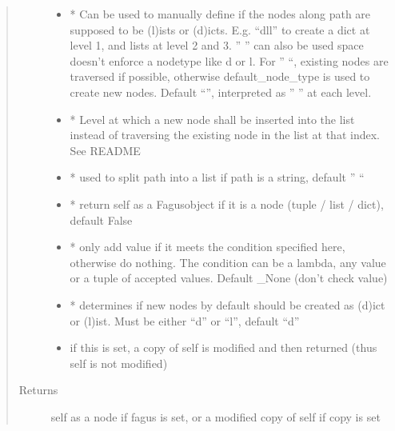 \documentclass[a4paper,10pt,english]{sphinxmanual}
\begin{document}
\begin{fulllineitems}
\begin{fulllineitems}
\begin{quote}
\begin{description}
\begin{itemize}
\item {}
\sphinxAtStartPar
{} \textendash{} * Can be used to manually define if the nodes along path are supposed to be (l)ists or
(d)icts. E.g. “dll” to create a dict at level 1, and lists at level 2 and 3. ” ” can also be used \sphinxhyphen{}
space doesn’t enforce a node\sphinxhyphen{}type like d or l. For ” “, existing nodes are traversed if possible,
otherwise default\_node\_type is used to create new nodes. Default “”, interpreted as ” ” at each level.

\item {}
\sphinxAtStartPar
{} \textendash{} * Level at which a new node shall be inserted into the list instead of traversing the
existing node in the list at that index. See README

\item {}
\sphinxAtStartPar
{} \textendash{} * used to split path into a list if path is a string, default ” “

\item {}
\sphinxAtStartPar
{} \textendash{} * return self as a Fagus\sphinxhyphen{}object if it is a node (tuple / list / dict), default False

\item {}
\sphinxAtStartPar
{} \textendash{} * only add value if it meets the condition specified here, otherwise do nothing. The condition can be
a lambda, any value or a tuple of accepted values. Default \_None (don’t check value)

\item {}
\sphinxAtStartPar
{} \textendash{} * determines if new nodes by default should be created as (d)ict or (l)ist. Must be
either “d” or “l”, default “d”

\item {}
\sphinxAtStartPar
{} \textendash{} if this is set, a copy of self is modified and then returned (thus self is not modified)

\end{itemize}

\item[{Returns}] \leavevmode
\sphinxAtStartPar
self as a node if fagus is set, or a modified copy of self if copy is set


\end{description}
\end{quote}
\end{fulllineitems}
\end{fulllineitems}
\end{document}
